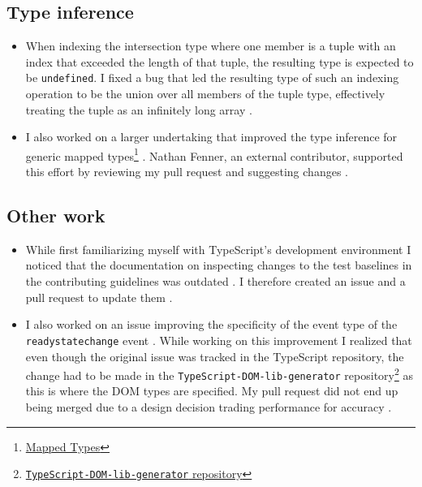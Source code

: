 \documentclass[12pt]{scrartcl}
\def\code#1{\texttt{\frenchspacing#1}}
\begin{document}
\subsection{Type inference}

\begin{itemize}
    \item When indexing the intersection type where one member is a tuple with an index that exceeded the length of that tuple, the resulting type is expected to be \code{undefined}. I fixed a bug that led the resulting type of such an indexing operation to be the union over all members of the tuple type, effectively treating the tuple as an infinitely long array \cite{42557,42602}.
    \item I also worked on a larger undertaking that improved the type inference for generic mapped types\footnote{\href{https://www.typescriptlang.org/docs/handbook/2/mapped-types.html}{Mapped Types}} \cite{37670,42382}. Nathan Fenner, an external contributor, supported this effort by reviewing my pull request and suggesting changes \cite{42382Comment}.
\end{itemize}

\subsection{Other work}

\begin{itemize}
    \item While first familiarizing myself with TypeScript's development environment I noticed that the documentation on inspecting changes to the test baselines in the contributing guidelines was outdated \cite{ContributingGuidelines}. I therefore created an issue and a pull request to update them \cite{41991,42031}.
    \item I also worked on an issue improving the specificity of the event type of the \code{readystatechange} event \cite{41775}. While working on this improvement I realized that even though the original issue was tracked in the TypeScript repository, the change had to be made in the \code{TypeScript-DOM-lib-generator} repository\footnote{\href{https://github.com/microsoft/TypeScript-DOM-lib-generator}{\code{TypeScript-DOM-lib-generator} repository}} as this is where the DOM types are specified. My pull request did not end up being merged due to a design decision trading performance for accuracy \cite{969Comment}.
\end{itemize}
\end{document}
